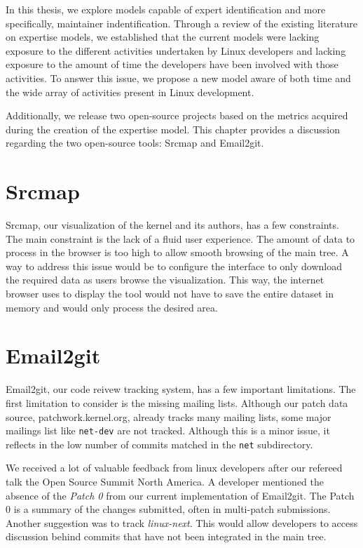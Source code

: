 \label{sec:general-discussion}


In this thesis, we explore models capable of expert identification and more specifically, maintainer indentification. Through a review of the existing literature on expertise models, we established that the current models were lacking exposure to the different activities undertaken by Linux developers and lacking exposure to the amount of time the developers have been involved with those activities. To answer this issue, we propose a new model aware of both time and the wide array of activities present in Linux development. 

Additionally, we release two open-source projects based on the metrics acquired during the creation of the expertise model. This chapter provides a discussion regarding the two open-source tools: Srcmap and Email2git.



\section{Srcmap}

Srcmap, our visualization of the kernel and its authors, has a few constraints. The main constraint is the lack of a fluid user experience. The amount of data to process in the browser is too high to allow smooth browsing of the main tree. A way to address this issue would be to configure the interface to only download the required data as users browse the visualization. This way, the internet browser uses to display the tool would not have to save the entire dataset in memory and would only process the desired area. 



\section{Email2git}

Email2git, our code reivew tracking system, has a few important limitations. The first limitation to consider is the missing mailing lists. Although our patch data source, patchwork.kernel.org, already tracks many mailing lists, some major mailings list like \texttt{net-dev} are not tracked. Although this is a minor issue, it reflects in the low number of commits matched in the \texttt{net} subdirectory. 

We received a lot of valuable feedback from linux developers after our refereed talk the Open Source Summit North America. A developer mentioned the absence of the \textit{Patch 0} from our current implementation of Email2git. The Patch 0 is a summary of the changes submitted, often in multi-patch submissions. Another suggestion was to track \textit{linux-next}. This would allow developers to access discussion behind commits that have not been integrated in the main tree. 

